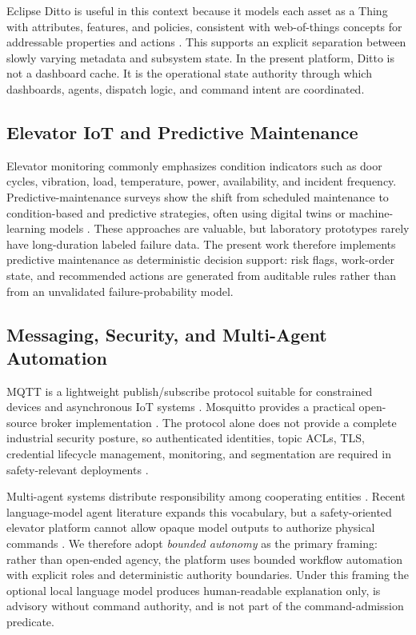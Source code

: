 \documentclass[journal]{IEEEtran}
\begin{document}
Eclipse Ditto is useful in this context because it models each asset as a Thing with attributes, features, and policies, consistent with web-of-things concepts for addressable properties and actions \cite{eclipseDittoDocs,w3cWoTArchitecture2023}. This supports an explicit separation between slowly varying metadata and subsystem state. In the present platform, Ditto is not a dashboard cache. It is the operational state authority through which dashboards, agents, dispatch logic, and command intent are coordinated.

\subsection{Elevator IoT and Predictive Maintenance}

Elevator monitoring commonly emphasizes condition indicators such as door cycles, vibration, load, temperature, power, availability, and incident frequency. Predictive-maintenance surveys show the shift from scheduled maintenance to condition-based and predictive strategies, often using digital twins or machine-learning models \cite{vanDinter2022predictiveMaintenance,zonta2020predictiveMaintenance}. These approaches are valuable, but laboratory prototypes rarely have long-duration labeled failure data. The present work therefore implements predictive maintenance as deterministic decision support: risk flags, work-order state, and recommended actions are generated from auditable rules rather than from an unvalidated failure-probability model.

\subsection{Messaging, Security, and Multi-Agent Automation}

MQTT is a lightweight publish/subscribe protocol suitable for constrained devices and asynchronous IoT systems \cite{hunkeler2008mqtt,oasisMqtt2019,naik2017messaging}. Mosquitto provides a practical open-source broker implementation \cite{light2017mosquitto}. The protocol alone does not provide a complete industrial security posture, so authenticated identities, topic ACLs, TLS, credential lifecycle management, monitoring, and segmentation are required in safety-relevant deployments \cite{nistSp80082,iec62443SecurityLevels2013,nistCsf2024,hassija2019iotSecurity}.

Multi-agent systems distribute responsibility among cooperating entities \cite{wooldridge2009multiAgent,dorri2018multiAgent}. Recent language-model agent literature expands this vocabulary, but a safety-oriented elevator platform cannot allow opaque model outputs to authorize physical commands \cite{xi2023llmAgents,wang2024llmAgents}. We therefore adopt \emph{bounded autonomy} as the primary framing: rather than open-ended agency, the platform uses bounded workflow automation with explicit roles and deterministic authority boundaries. Under this framing the optional local language model produces human-readable explanation only, is advisory without command authority, and is not part of the command-admission predicate.
\end{document}
